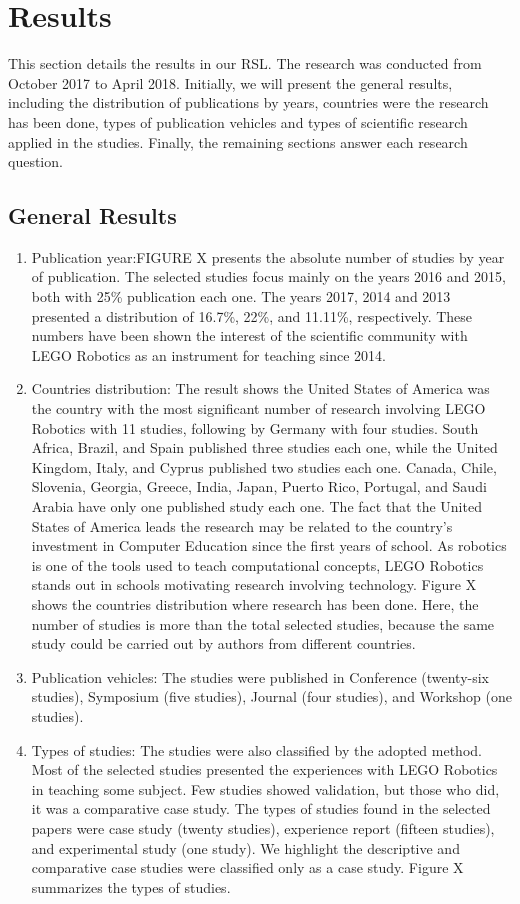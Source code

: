 \documentclass[conference]{IEEEtran}
\begin{document}
\section{Results}

This section details the results in our RSL. The research was conducted from October 2017 to April 2018. Initially, we will present the general results, including the distribution of publications by years, countries were the research has been done, types of publication vehicles and types of scientific research applied in the studies. Finally, the remaining sections answer each research question.

\subsection{General Results}
\begin{enumerate}
\item Publication year:FIGURE X presents the absolute number of studies by year of publication. The selected studies focus mainly on the years 2016 and 2015, both with 25\% publication each one. The years  2017, 2014 and 2013 presented a distribution of 16.7\%, 22\%, and 11.11\%, respectively. These numbers have been shown the interest of the scientific community with LEGO Robotics as an instrument for teaching since 2014. 
\item  Countries distribution: The result shows the United States of America was the country with the most significant number of research involving LEGO Robotics with 11 studies, following by Germany with four studies. South Africa, Brazil, and Spain published three studies each one, while the United Kingdom, Italy, and Cyprus published two studies each one. Canada, Chile, Slovenia, Georgia, Greece, India, Japan, Puerto Rico, Portugal, and Saudi Arabia have only one published study each one. The fact that the United States of America leads the research may be related to the country's investment in Computer Education since the first years of school. As robotics is one of the tools used to teach computational concepts, LEGO Robotics stands out in schools motivating research involving technology. Figure X shows the countries distribution where research has been done. Here, the number of studies is more than the total selected studies, because the same study could be carried out by authors from different countries. 
\item Publication vehicles: The studies were published in Conference (twenty-six studies), Symposium (five studies), Journal (four studies), and Workshop (one studies).
\item Types of studies:  The studies were also classified by the adopted method. Most of the selected studies presented the experiences with LEGO Robotics in teaching some subject. Few studies showed validation, but those who did, it was a comparative case study. The types of studies found in the selected papers were case study (twenty studies), experience report (fifteen studies), and experimental study (one study). We highlight the descriptive and comparative case studies were classified only as a case study. Figure X summarizes the types of studies. 
\end{enumerate}
\end{document}
